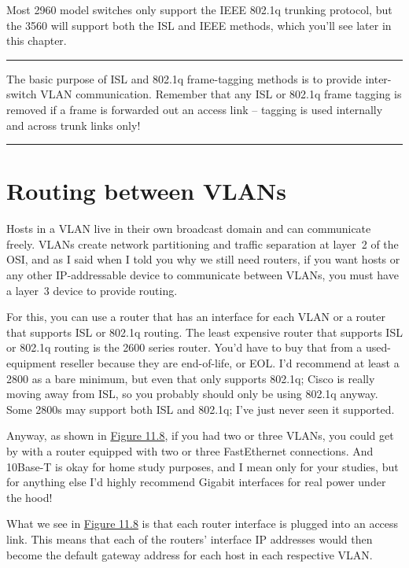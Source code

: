 Most 2960 model switches only support the IEEE 802.1q trunking protocol,
but the 3560 will support both the ISL and IEEE methods, which you'll
see later in this chapter.

\begin{center}\rule{0.5\linewidth}{0.5pt}\end{center}

The basic purpose of ISL and 802.1q
frame-tagging methods is to provide inter-switch VLAN communication.
Remember that any ISL or 802.1q frame tagging is removed if a frame is
forwarded out an access link -- tagging is used internally and across
trunk links only!

\begin{center}\rule{0.5\linewidth}{0.5pt}\end{center}



\section{Routing between VLANs}

Hosts in a VLAN live in their own broadcast domain and can communicate freely.
VLANs create network partitioning and traffic separation at layer~2 of the OSI, and as I said when I told you why we still need
routers, if you want hosts or any other IP-addressable device to communicate between VLANs, you must have a layer~3 device to provide routing.

For this, you can use a router that has an interface for each VLAN or a
router that supports ISL or 802.1q routing. The least expensive router
that supports ISL or 802.1q routing is the 2600 series router. You'd
have to buy that from a used-equipment reseller because they are
end-of-life, or EOL. I'd recommend at least a 2800 as a bare minimum,
but even that only supports 802.1q; Cisco is really moving away from
ISL, so you probably should only be using 802.1q anyway. Some 2800s may
support both ISL and 802.1q; I've just never seen it supported.

Anyway, as shown in
\protect\hyperlink{c11.xhtmlux5cux23figure11-8}{Figure 11.8}, if you had
two or three VLANs, you could get by with a router equipped with two or
three FastEthernet connections. And 10Base-T is okay for home study
purposes, and I mean only for your studies, but for anything else I'd
highly recommend Gigabit interfaces for real power under the hood!

What we see in \protect\hyperlink{c11.xhtmlux5cux23figure11-8}{Figure
11.8} is that each router interface is plugged into an access link. This
means that each of the routers' interface IP addresses would then become
the default gateway address for each host in each respective VLAN.


